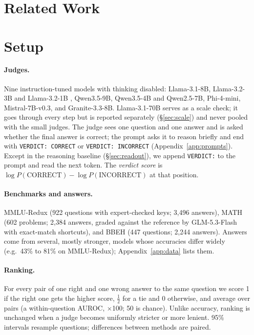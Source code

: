 \documentclass[11pt]{article}
\begin{document}
\section{Related Work}
\label{sec:related}


\section{Setup}
\label{sec:setup}

\paragraph{Judges.} Nine instruction-tuned models with thinking disabled: Llama-3.1-8B, Llama-3.2-3B and Llama-3.2-1B \citep{grattafiori2024llama3}, Qwen3.5-9B, Qwen3.5-4B and Qwen2.5-7B, Phi-4-mini, Mistral-7B-v0.3, and Granite-3.3-8B. Llama-3.1-70B serves as a scale check; it goes through every step but is reported separately (\S\ref{sec:scale}) and never pooled with the small judges. The judge sees one question and one answer and is asked whether the final answer is correct; the prompt asks it to reason briefly and end with \texttt{VERDICT: CORRECT} or \texttt{VERDICT: INCORRECT} (Appendix~\ref{app:prompts}). Except in the reasoning baseline (\S\ref{sec:readout}), we append \texttt{VERDICT:} to the prompt and read the next token. The \emph{verdict score} is $\log P(\text{CORRECT}) - \log P(\text{INCORRECT})$ at that position.

\paragraph{Benchmarks and answers.} MMLU-Redux \citep{gema-etal-2025-done} (922 questions with expert-checked keys; 3,496 answers), MATH \citep{hendrycks2021math} (602 problems; 2,384 answers, graded against the reference by GLM-5.3-Flash with exact-match shortcuts), and BBEH \citep{kazemi-etal-2025-big} (447 questions; 2,244 answers). Answers come from several, mostly stronger, models whose accuracies differ widely (e.g.\ 43\% to 81\% on MMLU-Redux); Appendix~\ref{app:data} lists them.

\paragraph{Ranking.} For every pair of one right and one wrong answer to the same question we score 1 if the right one gets the higher score, $\frac12$ for a tie and 0 otherwise, and average over pairs (a within-question AUROC, $\times$100; 50 is chance). Unlike accuracy, ranking is unchanged when a judge becomes uniformly stricter or more lenient. 95\% intervals resample questions; differences between methods are paired.
\end{document}
